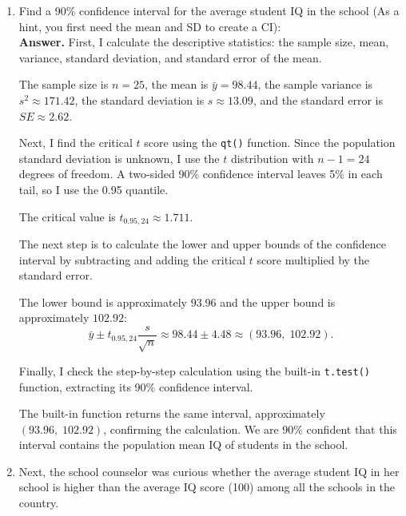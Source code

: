 \documentclass[12pt,letterpaper]{article}
\begin{document}
	\begin{enumerate}
		\item Find a 90\% confidence interval for the average student IQ in the school (As a hint, you first need the mean and SD to create a CI):\\
		
		
		\textbf{Answer.} First, I calculate the descriptive statistics: the sample size, mean, variance, standard deviation, and standard error of the mean.
		
		
		
		The sample size is $n=25$, the mean is $\bar{y}=98.44$, the sample variance is $s^2\approx171.42$, the standard deviation is $s\approx13.09$, and the standard error is $SE\approx2.62$.
		
		Next, I find the critical $t$ score using the \texttt{qt()} function. Since the population standard deviation is unknown, I use the $t$ distribution with $n-1=24$ degrees of freedom. A two-sided 90\% confidence interval leaves 5\% in each tail, so I use the 0.95 quantile.
		
		
		
		The critical value is $t_{0.95,24}\approx1.711$.
		
		The next step is to calculate the lower and upper bounds of the confidence interval by subtracting and adding the critical $t$ score multiplied by the standard error.
		
		
		
		The lower bound is approximately $93.96$ and the upper bound is approximately $102.92$:
		\[
		\bar{y} \pm t_{0.95,24}\frac{s}{\sqrt{n}}
		\approx 98.44 \pm 4.48
		\approx (93.96,\;102.92).
		\]
		
		Finally, I check the step-by-step calculation using the built-in \texttt{t.test()} function, extracting its 90\% confidence interval.
		
		
		
		The built-in function returns the same interval, approximately $(93.96,\;102.92)$, confirming the calculation. We are 90\% confident that this interval contains the population mean IQ of students in the school.
		
		\item Next, the school counselor was curious  whether  the average student IQ in her school is higher than the average IQ score (100) among all the schools in the country.\\
		

\end{enumerate}
\end{document}
